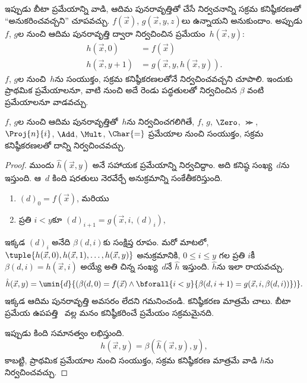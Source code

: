 \documentclass[../../../include/open-logic-section]{subfiles}
\begin{document}

ఇప్పుడు బీటా ప్రమేయాన్ని వాడి, ఆదిమ పునరావృత్తితో చేసే నిర్వచనాన్ని సక్రమ
కనిష్ఠీకరణతో ``అనుకరించవచ్చని'' చూపవచ్చు. $f(\vec x)$,
$g(\vec x,y,z)$లు ఉన్నాయని అనుకుందాం. అప్పుడు $f$, $g$ల నుంచి ఆదిమ
పునరావృత్తి ద్వారా నిర్వచించిన ప్రమేయం~$h(\vec x,y)$:
\begin{align*}
h(\vec x, 0) & =  f(\vec x) \\
h(\vec x, y+1) & =  g(\vec x, y, h(\vec x, y)).
\end{align*}
$f$, $g$ల నుంచి~$h$ను సంయుక్తం, సక్రమ కనిష్ఠీకరణలతోనే నిర్వచించవచ్చని
చూపాలి. ఇందుకు ప్రాథమిక ప్రమేయాలనూ, వాటి నుంచి అదే రెండు పద్ధతులతో
నిర్వచించిన $\beta$ వంటి ప్రమేయాలనూ వాడవచ్చు.

\begin{lem}
$f$, $g$ల నుంచి ఆదిమ పునరావృత్తితో~$h$ను నిర్వచించగలిగితే, $f$, $g$,
$\Zero$, $\Succ$, $\Proj{n}{i}$, $\Add$, $\Mult$, $\Char{=}$ ప్రమేయాల నుంచి
సంయుక్తం, సక్రమ కనిష్ఠీకరణలతో దాన్ని నిర్వచించవచ్చు.
\end{lem}

\begin{proof}
ముందు $\hat h(\vec x,y)$ అనే సహాయక ప్రమేయాన్ని నిర్వచిద్దాం. అది కనిష్ఠ
సంఖ్య~$d$ను ఇస్తుంది. ఆ~$d$ కింది షరతులు నెరవేర్చే అనుక్రమాన్ని సంకేతీకరిస్తుంది.
\begin{enumerate}
\item $(d)_0=f(\vec x)$, మరియు
\item ప్రతి $i<y$కూ $(d)_{i+1}=g(\vec x,i,(d)_i)$,
\end{enumerate}
ఇక్కడ $(d)_i$ అనేది $\beta(d,i)$కు సంక్షిప్త రూపం. మరో మాటలో,
$\tuple{h(\vec x,0),h(\vec x,1),\dots,h(\vec x,y)}$ అనుక్రమానికి,
$0\leq i\leq y$ గల ప్రతి $i$కీ $\beta(d,i)=h(\vec x,i)$ అయ్యే
అతి చిన్న సంఖ్య~$d$నే $\hat h$ ఇస్తుంది. $\hat h$ను ఇలా రాయవచ్చు.
\[
\hat h(\vec x, y) = \umin{d}{(\beta(d,0) = f(\vec x) \land \bforall{i <
  y}{\beta(d,i+1) = g(\vec x, i,\beta(d,i))})}.
\]
ఇక్కడ ఆదిమ పునరావృత్తి అవసరం లేదని గమనించండి. కనిష్ఠీకరణ మాత్రమే చాలు.
బీటా ప్రమేయ ఉపపత్తి~ వల్ల మనం కనిష్ఠీకరించే ప్రమేయం
సక్రమమైనది.

ఇప్పుడు కింది సమానత్వం లభిస్తుంది.
\[
h(\vec x, y) = \beta(\hat h(\vec x, y), y),
\]
కాబట్టి, ప్రాథమిక ప్రమేయాల నుంచి సంయుక్తం, సక్రమ కనిష్ఠీకరణ మాత్రమే వాడి
$h$ను నిర్వచించవచ్చు.
\end{proof}
\end{document}
